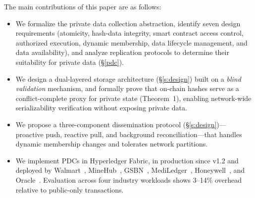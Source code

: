 The main contributions of this paper are as follows:
\begin{itemize}[topsep=0pt,noitemsep,leftmargin=15pt]
\item We formalize the private data collection abstraction, identify seven design requirements (atomicity, hash-data integrity, smart contract access control, authorized execution, dynamic membership, data lifecycle management, and data availability), and analyze replication protocols to determine their suitability for private data (\S\ref{pdc}).
\item We design a dual-layered storage architecture (\S\ref{s:design}) built on a \textit{blind validation} mechanism, and formally prove that on-chain hashes serve as a conflict-complete proxy for private state (Theorem~1), enabling network-wide serializability verification without exposing private data.
\item We propose a three-component dissemination protocol (\S\ref{s:design})---proactive push, reactive pull, and background reconciliation---that handles dynamic membership changes and tolerates network partitions.
\item We implement PDCs in Hyperledger Fabric, in production since v1.2 and deployed by Walmart~\cite{7-to-2, walmart-hf}, MineHub~\cite{minehub}, GSBN~\cite{gsbn}, MediLedger~\cite{mediledger-fda, mediledger-hf}, Honeywell~\cite{honeywell}, and Oracle~\cite{oracle-cbdc}. Evaluation across four industry workloads shows 3--14\% overhead relative to public-only transactions.
\end{itemize}
